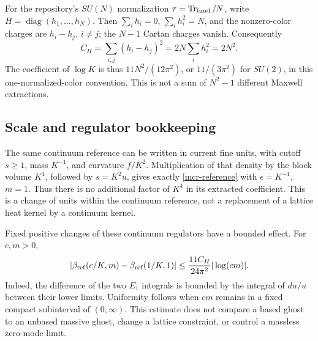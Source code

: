 For the repository's \(SU(N)\) normalization
\(\tau=\operatorname{Tr}_{\rm fund}/N\), write
\(H=\operatorname{diag}(h_1,\ldots,h_N)\). Then
\(\sum_i h_i=0\), \(\sum_i h_i^2=N\), and the
nonzero-color charges are \(h_i-h_j\), \(i\ne j\);
the \(N-1\) Cartan charges vanish. Consequently
\[
 C_H=\sum_{i,j}(h_i-h_j)^2
              =2N\sum_i h_i^2=2N^2.
\]
The coefficient of \(\log K\) is thus
\(11N^2/(12\pi^2)\), or \(11/(3\pi^2)\) for \(SU(2)\),
in this one-normalized-color convention.
This is not a sum of \(N^2-1\) different Maxwell extractions.

\subsection{Scale and regulator bookkeeping}
\label{mcr-scaling-section}

The same continuum reference can be written in current
fine units, with cutoff \(s\ge1\), mass \(K^{-1}\), and
curvature \(f/K^2\). Multiplication of that density by
the block volume \(K^4\), followed by \(s=K^2u\), gives
exactly \eqref{mcr-reference} with \(\epsilon=K^{-1}\),
\(m=1\). Thus there is no additional factor of \(K^4\)
in its extracted coefficient. This is a change of units
within the continuum reference, not a replacement of a
lattice heat kernel by a continuum kernel.

Fixed positive changes of these continuum regulators
have a bounded effect. For \(c,m>0\),
\begin{equation}
 |\beta_{\rm ref}(c/K,m)-\beta_{\rm ref}(1/K,1)|
 \le\frac{11C_H}{24\pi^2}|\log(cm)|.
 \label{mcr-regulator-change}
\end{equation}
Indeed, the difference of the two \(E_1\) integrals is
bounded by the integral of \(du/u\) between their lower
limits. Uniformity follows when \(cm\) remains in a
fixed compact subinterval of \((0,\infty)\).
This estimate does not compare a based ghost to an
unbased massive ghost, change a lattice constraint, or
control a massless zero-mode limit.

